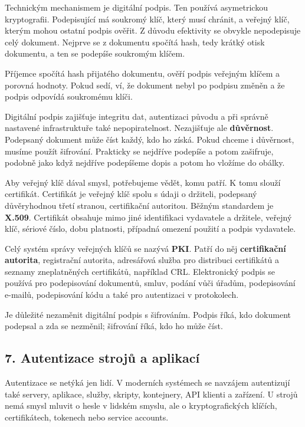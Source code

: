 Technickým mechanismem je digitální podpis. Ten používá asymetrickou kryptografii. Podepisující má soukromý klíč, který musí chránit, a veřejný klíč, kterým mohou ostatní podpis ověřit. Z důvodu efektivity se obvykle nepodepisuje celý dokument. Nejprve se z dokumentu spočítá hash, tedy krátký otisk dokumentu, a ten se podepíše soukromým klíčem.

Příjemce spočítá hash přijatého dokumentu, ověří podpis veřejným klíčem a porovná hodnoty. Pokud sedí, ví, že dokument nebyl po podpisu změněn a že podpis odpovídá soukromému klíči.

Digitální podpis zajišťuje integritu dat, autentizaci původu a při správně nastavené infrastruktuře také nepopiratelnost. Nezajišťuje ale \textbf{důvěrnost}. Podepsaný dokument může číst každý, kdo ho získá. Pokud chceme i důvěrnost, musíme použít šifrování. Prakticky se nejdříve podepíše a potom zašifruje, podobně jako když nejdříve podepíšeme dopis a potom ho vložíme do obálky.

Aby veřejný klíč dával smysl, potřebujeme vědět, komu patří. K tomu slouží certifikát. Certifikát je veřejný klíč spolu s údaji o držiteli, podepsaný důvěryhodnou třetí stranou, certifikační autoritou. Běžným standardem je \textbf{X.509}. Certifikát obsahuje mimo jiné identifikaci vydavatele a držitele, veřejný klíč, sériové číslo, dobu platnosti, případná omezení použití a podpis vydavatele.

Celý systém správy veřejných klíčů se nazývá \textbf{PKI}. Patří do něj \textbf{certifikační autorita}, registrační autorita, adresářová služba pro distribuci certifikátů a seznamy zneplatněných certifikátů, například CRL. Elektronický podpis se používá pro podepisování dokumentů, smluv, podání vůči úřadům, podepisování e-mailů, podepisování kódu a také pro autentizaci v protokolech.

Je důležité nezaměnit digitální podpis s šifrováním. Podpis říká, kdo dokument podepsal a zda se nezměnil; šifrování říká, kdo ho může číst.

\subsection*{7. Autentizace strojů a aplikací}

Autentizace se netýká jen lidí. V moderních systémech se navzájem autentizují také servery, aplikace, služby, skripty, kontejnery, API klienti a zařízení. U strojů nemá smysl mluvit o hesle v lidském smyslu, ale o kryptografických klíčích, certifikátech, tokenech nebo service accounts.

